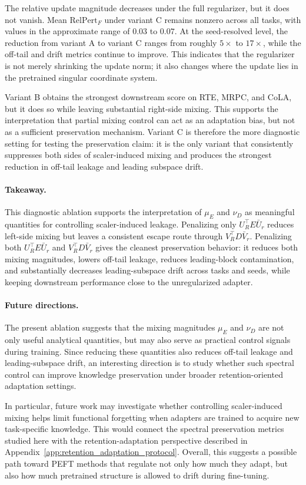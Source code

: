 The relative update magnitude decreases under the full regularizer, but it
does not vanish. Mean \(\mathrm{RelPert}_F\) under variant C remains nonzero
across all tasks, with values in the approximate range of \(0.03\) to \(0.07\).
At the seed-resolved level, the reduction from variant A to variant C ranges
from roughly \(5\times\) to \(17\times\), while the off-tail and drift metrics
continue to improve. This indicates that the regularizer is not merely
shrinking the update norm; it also changes where the update lies in the
pretrained singular coordinate system.

Variant B obtains the strongest downstream score on RTE, MRPC, and CoLA, but
it does so while leaving substantial right-side mixing. This supports the
interpretation that partial mixing control can act as an adaptation bias, but
not as a sufficient preservation mechanism. Variant C is therefore the more
diagnostic setting for testing the preservation claim: it is the only variant
that consistently suppresses both sides of scaler-induced mixing and produces
the strongest reduction in off-tail leakage and leading subspace drift.

\paragraph{Takeaway.}
This diagnostic ablation supports the interpretation of \(\mu_E\) and
\(\nu_D\) as meaningful quantities for controlling scaler-induced leakage.
Penalizing only \(U_R^\top E\bar{U}_r\) reduces left-side mixing but leaves a
consistent escape route through \(V_R^\top D\bar{V}_r\). Penalizing both
\(U_R^\top E\bar{U}_r\) and \(V_R^\top D\bar{V}_r\) gives the cleanest
preservation behavior: it reduces both mixing magnitudes, lowers off-tail
leakage, reduces leading-block contamination, and substantially decreases
leading-subspace drift across tasks and seeds, while keeping downstream
performance close to the unregularized adapter.

\paragraph{Future directions.}
The present ablation suggests that the mixing magnitudes \(\mu_E\) and
\(\nu_D\) are not only useful analytical quantities, but may also serve as
practical control signals during training. Since reducing these quantities also
reduces off-tail leakage and leading-subspace drift, an interesting direction
is to study whether such spectral control can improve knowledge preservation
under broader retention-oriented adaptation settings.

In particular, future work may investigate whether controlling scaler-induced
mixing helps limit functional forgetting when adapters are trained to acquire
new task-specific knowledge. This would connect the spectral preservation
metrics studied here with the retention-adaptation perspective described in
Appendix~\ref{app:retention_adaptation_protocol}. Overall, this suggests a
possible path toward PEFT methods that regulate not only how much they adapt,
but also how much pretrained structure is allowed to drift during fine-tuning.
